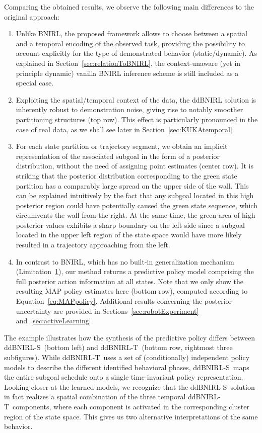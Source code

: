 \documentclass[twoside,11pt]{article}
\newcommand{\first}{(i)}
\newcommand{\second}{(ii)}
\newcommand{\third}{(iii)}
\newcommand{\fourth}{(iv)}
\newcommand{\ddBNIRLS}{\mbox{ddBNIRL-S}}
\newcommand{\ddBNIRLT}{\mbox{ddBNIRL-T}}
\begin{document}
Comparing %
the obtained results, we observe the following main differences to the original approach: 
\begin{enumerate}[topsep=-\parskip+1.5ex, itemsep=1ex, parsep=0mm]
\item[\first] Unlike BNIRL, the proposed framework allows to choose between a spatial and a temporal encoding of the observed task, providing the possibility to 
%
account explicitly
%
for the type of demonstrated behavior %
(static/dynamic).
As explained in Section~\ref{sec:relationToBNIRL}, the context-unaware (yet in principle %
dynamic) vanilla BNIRL inference scheme is still included as a special case. 
\item[\second] Exploiting the spatial/temporal context of the data, the \mbox{ddBNIRL} solution is inherently robust to demonstration noise, %
giving rise to notably smoother partitioning structures (top row). This effect is particularly pronounced in the case of real data, as we shall see later in Section~\ref{sec:KUKAtemporal}.
\item[\third] For each state partition or trajectory segment, we obtain an implicit representation of the associated subgoal in the form of a posterior distribution, without the need of assigning point estimates (center row). %
%
It is striking that the posterior distribution corresponding to the green state partition has a comparably large spread on the upper side of the wall. %
This can be explained intuitively by the fact that any subgoal located in this high posterior region could have potentially caused the %
green state sequence,
which %
circumvents the wall from the right. At the same time, the %
green area %
of high posterior values
%
exhibits a sharp boundary on the left side since a subgoal located %
in the upper left region of the state space would have more likely resulted in a trajectory %
approaching from the left. %
\item[\fourth] In contrast to BNIRL, which has no built-in generalization mechanism (Limitation~\hyperref[phantom:lim1]{1}), our method returns %
%
a predictive policy model comprising the full posterior action information at all states. Note that %
we only show the resulting MAP policy estimates here (bottom row), computed according to Equation~\eqref{eq:MAPpolicy}. Additional results %
concerning the posterior uncertainty are provided in Sections~\ref{sec:robotExperiment} and~\ref{sec:activeLearning}.
\end{enumerate}
The example %
illustrates how the synthesis of the predictive policy differs between \ddBNIRLS\ (bottom left) and \ddBNIRLT\  (bottom row, rightmost three subfigures). While \ddBNIRLT\  uses a set of (conditionally) independent policy models to describe the different identified behavioral phases, \ddBNIRLS\  maps the entire subgoal schedule onto a single time-invariant policy representation. Looking closer at the learned models, we recognize that the \ddBNIRLS\  solution in fact realizes a spatial combination of the three temporal \ddBNIRLT\  components, where each component is activated in the corresponding cluster region of the state space. This gives us two alternative %
interpretations of the same behavior.
\end{document}
